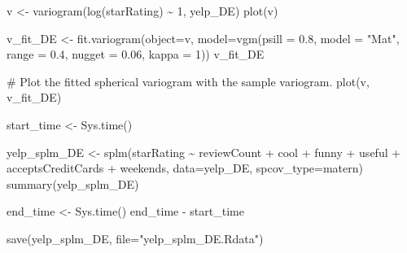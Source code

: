 \documentclass[
  12pt,
  letterpaper,
  DIV=11,
  numbers=noendperiod]{scrartcl}
\newenvironment{Shaded}{\begin{snugshade}}{\end{snugshade}}
\newcommand{\AttributeTok}[1]{\textcolor[rgb]{0.98,0.46,0.51}{#1}}
\newcommand{\CommentTok}[1]{\textcolor[rgb]{0.42,0.45,0.49}{#1}}
\newcommand{\DecValTok}[1]{\textcolor[rgb]{0.47,0.72,1.00}{#1}}
\newcommand{\FloatTok}[1]{\textcolor[rgb]{0.47,0.72,1.00}{#1}}
\newcommand{\FunctionTok}[1]{\textcolor[rgb]{0.70,0.57,0.94}{#1}}
\newcommand{\NormalTok}[1]{\textcolor[rgb]{0.88,0.89,0.91}{#1}}
\newcommand{\OtherTok}[1]{\textcolor[rgb]{0.70,0.57,0.94}{#1}}
\newcommand{\SpecialCharTok}[1]{\textcolor[rgb]{0.47,0.72,1.00}{#1}}
\newcommand{\StringTok}[1]{\textcolor[rgb]{0.62,0.80,1.00}{#1}}
\begin{document}
\begin{Shaded}
\begin{Highlighting}[]
\NormalTok{v }\OtherTok{\textless{}{-}} \FunctionTok{variogram}\NormalTok{(}\FunctionTok{log}\NormalTok{(starRating) }\SpecialCharTok{\textasciitilde{}} \DecValTok{1}\NormalTok{, yelp\_DE)}
\FunctionTok{plot}\NormalTok{(v)}
\end{Highlighting}
\end{Shaded}

\begin{Shaded}
\begin{Highlighting}[]
\NormalTok{v\_fit\_DE }\OtherTok{\textless{}{-}} \FunctionTok{fit.variogram}\NormalTok{(}\AttributeTok{object=}\NormalTok{v, }
                           \AttributeTok{model=}\FunctionTok{vgm}\NormalTok{(}\AttributeTok{psill =} \FloatTok{0.8}\NormalTok{, }\AttributeTok{model =} \StringTok{"Mat"}\NormalTok{, }
                                     \AttributeTok{range =} \FloatTok{0.4}\NormalTok{, }\AttributeTok{nugget =} \FloatTok{0.06}\NormalTok{, }\AttributeTok{kappa =} \DecValTok{1}\NormalTok{))}
\NormalTok{v\_fit\_DE}

\CommentTok{\# Plot the fitted spherical variogram with the sample variogram.}
\FunctionTok{plot}\NormalTok{(v, v\_fit\_DE)}
\end{Highlighting}
\end{Shaded}

\begin{Shaded}
\begin{Highlighting}[]
\NormalTok{start\_time }\OtherTok{\textless{}{-}} \FunctionTok{Sys.time}\NormalTok{()}


\NormalTok{yelp\_splm\_DE }\OtherTok{\textless{}{-}} \FunctionTok{splm}\NormalTok{(starRating }\SpecialCharTok{\textasciitilde{}}\NormalTok{ reviewCount }\SpecialCharTok{+}\NormalTok{ cool }\SpecialCharTok{+}\NormalTok{ funny }\SpecialCharTok{+}\NormalTok{ useful }\SpecialCharTok{+}\NormalTok{ acceptsCreditCards }\SpecialCharTok{+}\NormalTok{ weekends, }\AttributeTok{data=}\NormalTok{yelp\_DE, }\AttributeTok{spcov\_type=}\StringTok{\textquotesingle{}matern\textquotesingle{}}\NormalTok{)}
\FunctionTok{summary}\NormalTok{(yelp\_splm\_DE)}

\NormalTok{end\_time }\OtherTok{\textless{}{-}} \FunctionTok{Sys.time}\NormalTok{()}
\NormalTok{end\_time }\SpecialCharTok{{-}}\NormalTok{ start\_time}
\end{Highlighting}
\end{Shaded}

\begin{Shaded}
\begin{Highlighting}[]
\FunctionTok{save}\NormalTok{(yelp\_splm\_DE, }\AttributeTok{file=}\StringTok{"yelp\_splm\_DE.Rdata"}\NormalTok{)}
\end{Highlighting}
\end{Shaded}
\end{document}
